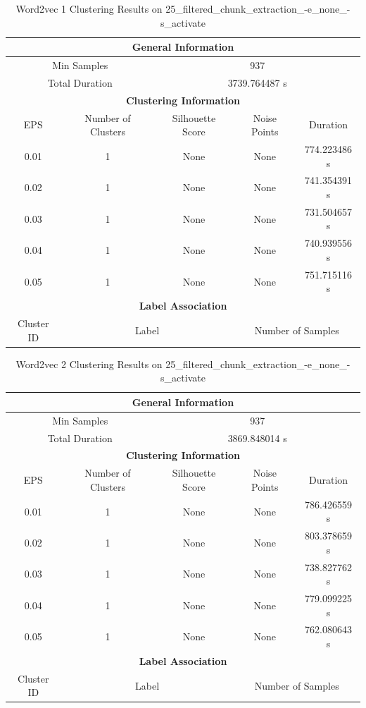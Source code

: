 \begin{longtable}{|c|c|c|c|c|}
\caption{Word2vec 1 Clustering Results on 25\_filtered\_chunk\_extraction\_-e\_none\_-s\_activate} \label{tab:25_filtered_chunk_extraction_-e_none_-s_activate_word2vec_1_clustering_results}\\
\hline
\multicolumn{5}{|c|}{\textbf{General Information}} \\
\hline
\multicolumn{2}{|c|}{Min Samples} & \multicolumn{3}{c|}{937} \\
\multicolumn{2}{|c|}{Total Duration} & \multicolumn{3}{c|}{3739.764487 s} \\
\hline
\multicolumn{5}{|c|}{\textbf{Clustering Information}} \\
\hline
EPS & Number of Clusters & Silhouette Score & Noise Points & Duration \\
0.01 & 1 & None & None & 774.223486 s\\
0.02 & 1 & None & None & 741.354391 s\\
0.03 & 1 & None & None & 731.504657 s\\
0.04 & 1 & None & None & 740.939556 s\\
0.05 & 1 & None & None & 751.715116 s\\
\hline
\multicolumn{5}{|c|}{\textbf{Label Association}} \\
\hline
Cluster ID & \multicolumn{2}{c|}{Label} & \multicolumn{2}{c|}{Number of Samples} \\
\hline
\end{longtable}


\begin{longtable}{|c|c|c|c|c|}
\caption{Word2vec 2 Clustering Results on 25\_filtered\_chunk\_extraction\_-e\_none\_-s\_activate} \label{tab:25_filtered_chunk_extraction_-e_none_-s_activate_word2vec_2_clustering_results}\\
\hline
\multicolumn{5}{|c|}{\textbf{General Information}} \\
\hline
\multicolumn{2}{|c|}{Min Samples} & \multicolumn{3}{c|}{937} \\
\multicolumn{2}{|c|}{Total Duration} & \multicolumn{3}{c|}{3869.848014 s} \\
\hline
\multicolumn{5}{|c|}{\textbf{Clustering Information}} \\
\hline
EPS & Number of Clusters & Silhouette Score & Noise Points & Duration \\
0.01 & 1 & None & None & 786.426559 s\\
0.02 & 1 & None & None & 803.378659 s\\
0.03 & 1 & None & None & 738.827762 s\\
0.04 & 1 & None & None & 779.099225 s\\
0.05 & 1 & None & None & 762.080643 s\\
\hline
\multicolumn{5}{|c|}{\textbf{Label Association}} \\
\hline
Cluster ID & \multicolumn{2}{c|}{Label} & \multicolumn{2}{c|}{Number of Samples} \\
\hline
\end{longtable}


